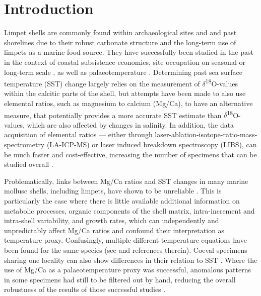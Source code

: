 \documentclass[
  authoryear,
  preprint,
  3p]{elsarticle}
\begin{document}
\section{Introduction}\label{Introduction}

Limpet shells are commonly found within archaeological sites and and
past shorelines due to their robust carbonate structure and the
long-term use of limpets as a marine food source. They have successfully
been studied in the past in the context of coastal subsistence
economies, site occupation on seasonal
\citep{Shackleton1973-ij, Parker2018-wf, Bosch2018-ud} or long-term
scale \citep{Ortiz2015-mr}, as well as palaeotemperature
\citep{Fenger2007-gf, Surge2012-ba, Wang2012-ee, Colonese2012-ct, Ferguson2011-zl}.
Determining past sea surface temperature (SST) change largely relies on
the measurement of \(\delta\)\textsuperscript{18}O-values within the
calcitic parts of the shell, but attempts have been made to also use
elemental ratios, such as magnesium to calcium (Mg/Ca), to have an
alternative measure, that potentially provides a more accurate SST
estimate than \(\delta\)\textsuperscript{18}O-values, which are also
affected by changes in salinity. In addition, the data acquisition of
elemental ratios --- either through
laser-ablation-isotope-ratio-mass-spectrometry (LA-ICP-MS) or laser
induced breakdown spectroscopy (LIBS), can be much faster and
cost-effective, increasing the number of specimens that can be studied
overall \citep{Durham2017-fh, Hausmann2023-ih}.

Problematically, links between Mg/Ca ratios and SST changes in many
marine mollusc shells, including limpets, have shown to be unreliable
\citep{Surge2008-ri, Wanamaker2008-zl, Schone2010-yl, Freitas2012-tx, Graniero2015-zv, Poulain2015-dg, Vihtakari2017-wd}.
This is particularly the case where there is little available additional
information on metabolic processes, organic components of the shell
matrix, intra-increment and intra-shell variability, and growth rates,
which can independently and unpredictably affect Mg/Ca ratios and
confound their interpretation as temperature proxy. Confusingly,
multiple different temperature equations have been found for the same
species (see \citep{Freitas2012-tx, Vihtakari2017-wd} and references
therein). Coeval specimens sharing one locality can also show
differences in their relation to SST \citep{Hausmann2019-fi}. Where the
use of Mg/Ca as a palaeotemperature proxy was successful, anomalous
patterns in some specimens had still to be filtered out by hand,
reducing the overall robustness of the results of those successful
studies \citep{Ferguson2011-zl}.
\end{document}
